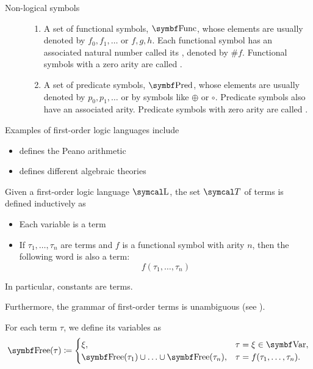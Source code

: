 \begin{definition}
\begin{description}
    \item[Non-logical symbols]
    \mbox{}
    \begin{enumerate}
      \item A set of functional symbols, \( \Cat{Func} \), whose elements are usually denoted by \( f_0, f_1, \ldots \) or \( f, g, h \). Each functional symbol has an associated natural number called its , denoted by \( \# f \). Functional symbols with a zero arity are called .

      \item A set of predicate symbols, \( \Cat{Pred} \), whose elements are usually denoted by \( p_0, p_1, \ldots \) or by symbols like \( \oplus \) or \( \circ \). Predicate symbols also have an associated arity. Predicate symbols with zero arity are called .
    \end{enumerate}
  \end{description}
\end{definition}

\begin{example}\label{ex:first_order_languages}
  Examples of first-order logic languages include
  \begin{itemize}
    \item {} defines the Peano arithmetic
    \item {} defines different algebraic theories
  \end{itemize}
\end{example}

\begin{definition}\label{def:first_order_term}\cite[189]{OpenLogic20201202}
  Given a first-order logic language \( \CL \), the set \( \Cal{T} \) of terms is defined inductively as
  \begin{itemize}
    \item Each variable is a term
    \item If \( \tau_1, \ldots, \tau_n \) are terms and \( f \) is a functional symbol with arity \( n \), then the following word is also a term:
    \begin{equation*}
      f(\tau_1, \ldots, \tau_n)
    \end{equation*}
  \end{itemize}

  In particular, constants are terms.

  Furthermore, the grammar of first-order terms is unambiguous (see ).

  For each term \( \tau \), we define its variables as
  \begin{align*}
    \Bold{Free}(\tau) \coloneqq \begin{cases}
      \xi,                                                      &\tau = \xi \in \Bold{Var}, \\
      \Bold{Free}(\tau_1) \cup \ldots \cup \Bold{Free}(\tau_n), &\tau = f(\tau_1, \ldots, \tau_n).
    \end{cases}
  \end{align*}
\end{definition}

